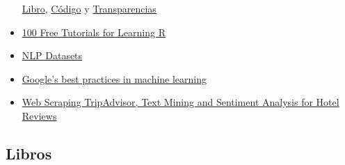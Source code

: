 \documentclass[]{article}
\begin{document}
\begin{itemize}
  \href{https://web.stanford.edu/~hastie/ElemStatLearn/}{Libro},
  \href{https://github.com/khanhnamle1994/statistical-learning}{Código}
  y
  \href{https://github.com/khanhnamle1994/statistical-learning/tree/master/Lecture-Slides}{Transparencias}
\item
  \href{https://www.listendata.com/p/r-programming-tutorials.html}{100
  Free Tutorials for Learning R}
\item
  \href{https://github.com/niderhoff/nlp-datasets/blob/master/README.md}{NLP
  Datasets}
\item
  \href{https://developers.google.com/machine-learning/guides/rules-of-ml/}{Google's
  best practices in machine learning}
\item
  \href{https://towardsdatascience.com/scraping-tripadvisor-text-mining-and-sentiment-analysis-for-hotel-reviews-cc4e20aef333}{Web
  Scraping TripAdvisor, Text Mining and Sentiment Analysis for Hotel
  Reviews}
\end{itemize}

\subsection{Libros}\label{libros}
\end{document}
